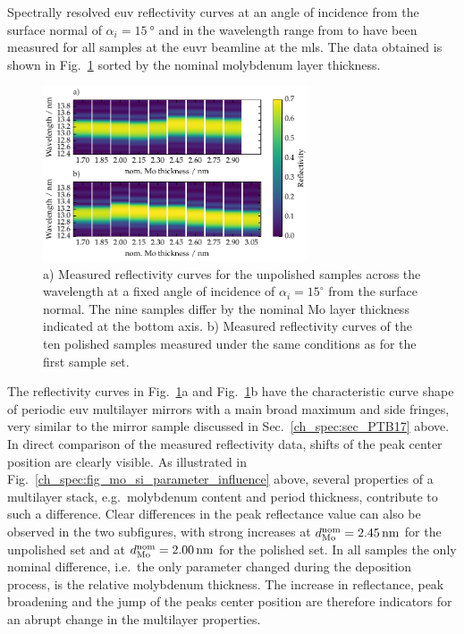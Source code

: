 Spectrally resolved \gls{euv} reflectivity curves at an angle of incidence from the surface normal of $\alpha_i=\SI{15}{\degree}$ and in the wavelength range from  to  have been measured for all samples at the \gls{euvr} beamline at the \gls{mls}. The data obtained is shown in Fig.~\ref{ch_spec:fig_EUV_reflectivity_unpolished_and_polished} sorted by the nominal molybdenum layer thickness.
\begin{figure}[htbp]
\centering
\includegraphics[width=0.7\textwidth]{img/MoSi_EUV_reflectivity}
\caption{a) Measured reflectivity curves for the unpolished samples across the wavelength at a fixed angle of incidence of $\alpha_i = 15^\circ$ from the surface normal. The nine samples differ by the nominal Mo layer thickness indicated at the bottom axis. b) Measured reflectivity curves of the ten polished samples measured under the same conditions as for the first sample set.}
\label{ch_spec:fig_EUV_reflectivity_unpolished_and_polished}
\end{figure}
The reflectivity curves in Fig.~\ref{ch_spec:fig_EUV_reflectivity_unpolished_and_polished}a and Fig.~\ref{ch_spec:fig_EUV_reflectivity_unpolished_and_polished}b have the characteristic curve shape of periodic \gls{euv} multilayer mirrors with a main broad maximum and side fringes, very similar to the mirror sample discussed in Sec.~\ref{ch_spec:sec_PTB17} above. In direct comparison of the measured reflectivity data, shifts of the peak center position are clearly visible. As illustrated in Fig.~\ref{ch_spec:fig_mo_si_parameter_influence} above, several properties of a multilayer stack, e.g.~molybdenum content and period thickness, contribute to such a difference. Clear differences in the peak reflectance value can also be observed in the two subfigures, with strong increases at $d_\text{Mo}^\text{nom} = \nm{2.45}$ for the unpolished set and at $d_\text{Mo}^\text{nom} = \nm{2.00}$ for the polished set. In all samples the only nominal difference, i.e.~the only parameter changed during the deposition process, is the relative molybdenum thickness. The increase in reflectance, peak broadening and the jump of the peaks center position are therefore indicators for an abrupt change in the multilayer properties.

